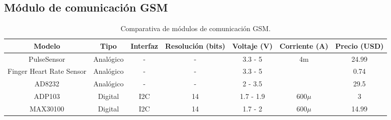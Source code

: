 
\subsection{Módulo de comunicación GSM}

\begin{center}
	\begin{sidewaystable}
		\begin{tabular}{|c|c|c|c|c|c|c|}
			\hline
			Modelo&Tipo&Interfaz&Resolución (bits)&Voltaje (V)&Corriente (A)&Precio (USD)\\
			\hline
			\hline
			PulseSensor & Analógico&-&-& 3.3 - 5&4m&24.99 \\
			\hline
			Finger Heart Rate Sensor & Analógico& -&- & 3.3 - 5&&0.74 \\
			\hline
			AD8232 & Analógico& -& - & 2 - 3.5&&29.5 \\
			\hline
			ADP103 & Digital& I2C& 14 & 1.7 - 1.9&$600\mu$&3 \\
			\hline
			MAX30100 & Digital& I2C &14 & 1.7 - 2&$600\mu$&14.99 \\
			\hline
		\end{tabular}
		\caption{Comparativa de módulos de comunicación GSM.}
	\end{sidewaystable}
\end{center}